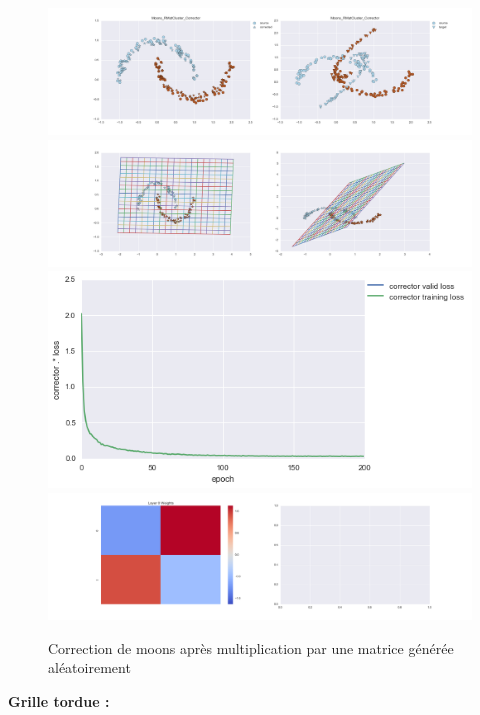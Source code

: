 \begin{figure}[H] %
\centering
\includegraphics[width=\linewidth]{fig/24-05-2016/moons/Moons_RMatCluster_Corrector-DATA.png}
\includegraphics[width=\linewidth]{fig/24-05-2016/moons/Moons_RMatCluster_Corrector-GridCheck.png}
\includegraphics[width=0.45\linewidth]{fig/24-05-2016/moons/Moons_RMatCluster_Corrector-Learning_curve.png}
\includegraphics[width=\linewidth]{fig/24-05-2016/moons/Moons_RMatCluster_Corrector-W.png}
\caption{Correction de moons après multiplication par une matrice générée aléatoirement}
\label{fig:recap-moons-RMat-cluster}
\end{figure}

{\Large \textbf{Grille tordue :}}


